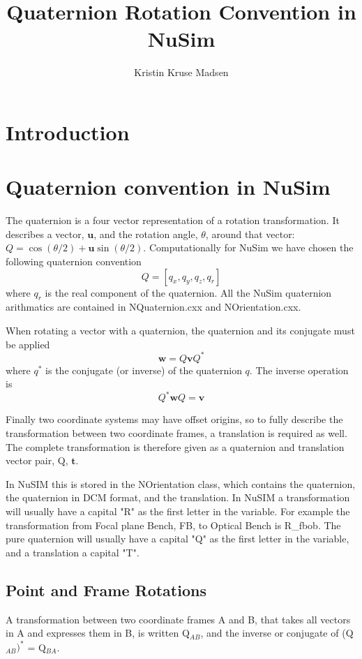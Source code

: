 \documentclass[11pt]{article}
\title{Quaternion Rotation Convention in NuSim}
\author{Kristin Kruse Madsen}
\date{}                                           %
\begin{document}
\maketitle
\section*{Introduction}

\section{Quaternion convention in NuSim}
The quaternion is a four vector representation of a rotation transformation. It describes a vector, $\mathbf{u}$, and the rotation angle, $\theta$, around that vector:  $Q = \cos(\theta/2)+\mathbf{u}\sin(\theta/2)$. Computationally for NuSim we have chosen the following quaternion convention
\begin{equation}
Q = [q_x, q_y, q_z,q_r]  
\end{equation}
where $q_r$ is the real component of the quaternion. All the NuSim quaternion arithmatics are contained in NQuaternion.cxx and NOrientation.cxx.

When rotating a vector with a quaternion, the quaternion and its conjugate must be applied
\begin{equation}
\mathbf{w} = Q\mathbf{v}Q^*   
\end{equation}
where $q^*$ is the conjugate (or inverse) of the quaternion $q$. The inverse operation is
\begin{equation}
Q^*\mathbf{w}Q = \mathbf{v}   
\end{equation}

Finally two coordinate systems may have offset origins, so to fully describe the transformation between two coordinate frames, a translation is required as well. The complete transformation is therefore given as a quaternion and translation vector pair, Q, $\mathbf{t}$. 

In NuSIM this is stored in the NOrientation class, which contains the quaternion, the quaternion in DCM format, and the translation. In NuSIM a transformation will usually have a capital "R" as the first letter in the variable. For example the transformation from Focal plane Bench, FB, to Optical Bench is R\_fbob. The pure quaternion will usually have a capital "Q" as the first letter in the variable, and a translation a capital "T".

\subsection{Point and Frame Rotations}
A transformation between two coordinate frames A and B, that takes all vectors in A and expresses them in B, is written Q$_{AB}$, and the  inverse or conjugate of (Q$_{AB})^*$ = Q$_{BA}$.
\end{document}
